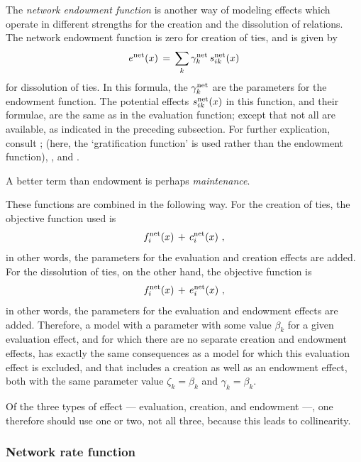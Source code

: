 \documentclass[a4paper,fleqn,11pt]{article}
\newcommand{\+}{\, + \,}
\begin{document}
The \emph{network endowment function}
is another way of modeling effects which operate in
different strengths for the creation and the dissolution of
relations.
The network endowment function is zero for creation of ties,
and is given by
\begin{equation}
e^{\rm net}(x) \, = \, \sum_k \gamma^{\rm net}_k \, s^{\rm net}_{ik}(x)
                                                           \label{e_net}
\end{equation}
for dissolution of ties.
In this formula, the $\gamma_k^{\rm net}$
are the parameters for the endowment function.
The potential effects $s^{\rm net}_{ik}(x) $ in this function, and their
formulae, are the same as in the evaluation function;
except that not all are available, as indicated in the preceding subsection.
For further explication, consult \citet{Snijders01, Snijders05};
(here, the `gratification function' is used rather than the endowment function),
\citet*{SnijdersEA07}, and \citet*{SteglichEA10}.

A better term than endowment is perhaps \emph{maintenance}.


These functions are combined in the following way.
For the creation of ties, the objective function used is
\begin{equation}
f_i^{\rm net}(x) \,+\, c_i^{\rm net}(x)     \ ,             \label{fc_net}
\end{equation}
in other words, the parameters for the evaluation and creation effects are
added.
For the dissolution of ties, on the other hand, the objective function is
\begin{equation}
f_i^{\rm net}(x) \,+\, e_i^{\rm net}(x)      \ ,            \label{fe_net}
\end{equation}
in other words, the parameters for the evaluation and endowment effects are
added.
Therefore, a model with a parameter with some value $\beta_k$
for a given evaluation effect,
and for which there are no separate creation and endowment effects,
has exactly the same consequences as a model for which this
evaluation effect is excluded, and that includes a creation as well as
an endowment effect, both with the same parameter value
$\zeta_k = \beta_k$ and $\gamma_k = \beta_k$.

Of the three types of effect --- evaluation, creation, and endowment ---,
one therefore should use one or two, not all three, because this leads to collinearity.


\subsubsection{Network rate function} \label{S_r}
\end{document}
